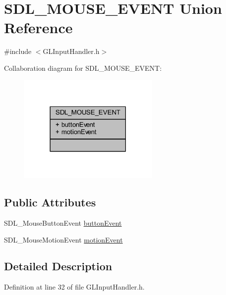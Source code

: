 \hypertarget{union_s_d_l___m_o_u_s_e___e_v_e_n_t}{}\section{S\+D\+L\+\_\+\+M\+O\+U\+S\+E\+\_\+\+E\+V\+E\+NT Union Reference}
\label{union_s_d_l___m_o_u_s_e___e_v_e_n_t}


{\ttfamily \#include $<$G\+L\+Input\+Handler.\+h$>$}



Collaboration diagram for S\+D\+L\+\_\+\+M\+O\+U\+S\+E\+\_\+\+E\+V\+E\+NT\+:\nopagebreak
\begin{figure}[H]
\begin{center}
\leavevmode
\includegraphics[width=194pt]{union_s_d_l___m_o_u_s_e___e_v_e_n_t__coll__graph}
\end{center}
\end{figure}
\subsection*{Public Attributes}
\begin{DoxyCompactItemize}
\item 
S\+D\+L\+\_\+\+Mouse\+Button\+Event \hyperlink{union_s_d_l___m_o_u_s_e___e_v_e_n_t_ad50a05e3e7614096226545a17674b21e}{button\+Event}
\item 
S\+D\+L\+\_\+\+Mouse\+Motion\+Event \hyperlink{union_s_d_l___m_o_u_s_e___e_v_e_n_t_af8459d7e4e5e53b2caf6e39db087f17c}{motion\+Event}
\end{DoxyCompactItemize}


\subsection{Detailed Description}


Definition at line 32 of file G\+L\+Input\+Handler.\+h.



